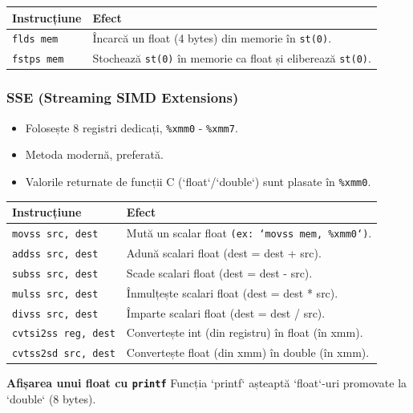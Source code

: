 \documentclass[12pt,a4paper]{article}
\begin{document}
\begin{table}[ht!]
\centering
\begin{tabular}{ll}
\toprule
\textbf{Instrucțiune} & \textbf{Efect} \\
\midrule
\texttt{flds mem} & Încarcă un float (4 bytes) din memorie în \texttt{st(0)}. \\
\texttt{fstps mem} & Stochează \texttt{st(0)} în memorie ca float și eliberează \texttt{st(0)}. \\
\bottomrule
\end{tabular}
\end{table}

\subsubsection{SSE (Streaming SIMD Extensions)}
\begin{itemize}
    \item Folosește 8 registri dedicați, \texttt{\%xmm0} - \texttt{\%xmm7}.
    \item Metoda modernă, preferată.
    \item Valorile returnate de funcții C (`float`/`double`) sunt plasate în \texttt{\%xmm0}.
\end{itemize}

\begin{table}[ht!]
\centering
\begin{tabular}{ll}
\toprule
\textbf{Instrucțiune} & \textbf{Efect} \\
\midrule
\texttt{movss src, dest} & Mută un scalar float \texttt{(ex: `movss mem, \%xmm0`)}. \\
\texttt{addss src, dest} & Adună scalari float (dest = dest + src). \\
\texttt{subss src, dest} & Scade scalari float (dest = dest - src). \\
\texttt{mulss src, dest} & Înmulțește scalari float (dest = dest * src). \\
\texttt{divss src, dest} & Împarte scalari float (dest = dest / src). \\
\texttt{cvtsi2ss reg, dest} & Convertește int (din registru) în float (în xmm). \\
\texttt{cvtss2sd src, dest} & Convertește float (din xmm) în double (în xmm). \\
\bottomrule
\end{tabular}
\end{table}

\textbf{Afișarea unui float cu \texttt{printf}}
Funcția `printf` așteaptă `float`-uri promovate la `double` (8 bytes).
\end{document}
